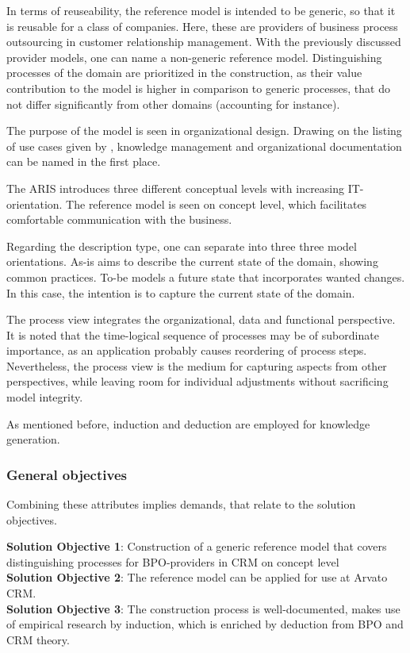 In terms of reuseability, the reference model is intended to be generic, so that it is reusable for a class of companies. Here, these are providers of business process outsourcing in customer relationship management. With the previously discussed provider models, one can name a non-generic reference model. Distinguishing processes of the domain are prioritized in the construction, as their value contribution to the model is higher in comparison to generic processes, that do not differ significantly from other domains (accounting for instance).  

The purpose of the model is seen in organizational design. Drawing on the listing of use cases given by \cite{Rosemann2012proc}, knowledge management and organizational documentation can be named in the first place. 

The \acrshort{ARIS} introduces three different conceptual levels with increasing IT-orientation. The reference model is seen on concept level, which facilitates comfortable communication with the business. 
\todo{+++}

Regarding the description type, one can separate into three three model orientations. As-is aims to describe the current state of the domain, \viz showing common practices. To-be models a future state that incorporates wanted changes. In this case, the intention is to capture the current state of the domain. 

The process view integrates the organizational, data and functional perspective. It is noted that the time-logical sequence of processes may be of subordinate importance, as an application probably causes reordering of process steps. Nevertheless, the process view is the medium for capturing aspects from other perspectives, while leaving room for individual adjustments without sacrificing model integrity. 

As mentioned before, induction and deduction are employed for knowledge generation.
 
\subsubsection{General objectives}
Combining these attributes implies demands, that relate to the solution objectives.

\hfill\begin{minipage}{\dimexpr\textwidth-1.2cm}
	\textbf{Solution Objective 1}: Construction of a generic  reference model that covers distinguishing processes for BPO-providers in CRM on concept level
	\\
	
	\textbf{Solution Objective 2}: The reference model can be applied for use at Arvato CRM.  
	\\
	
	\textbf{Solution Objective 3}: The construction  process is well-documented, makes use of empirical research by induction, which is enriched by deduction from \acrshort{BPO} and \acrshort{CRM} theory.
	
	\xdef\tpd{\the\prevdepth}
\end{minipage}


